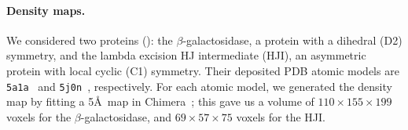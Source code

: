 \paragraph{Density maps.}
We considered two proteins (): the $\beta$-galactosidase, a protein with a dihedral (D2) symmetry, and the lambda excision HJ intermediate (HJI), an asymmetric protein with local cyclic (C1) symmetry.
Their deposited PDB atomic models are \texttt{5a1a}~\cite{bartesaghi2015betagal} and \texttt{5j0n}~\cite{laxmikanthan2016structure}, respectively. 
For each atomic model, we generated the density map by fitting a 5\AA\ map in Chimera~\cite{pettersen2004ucsf}; this gave us a volume of $110 \times 155 \times 199$ voxels for the $\beta$-galactosidase, and $69 \times 57 \times 75$ voxels for the HJI\@.

